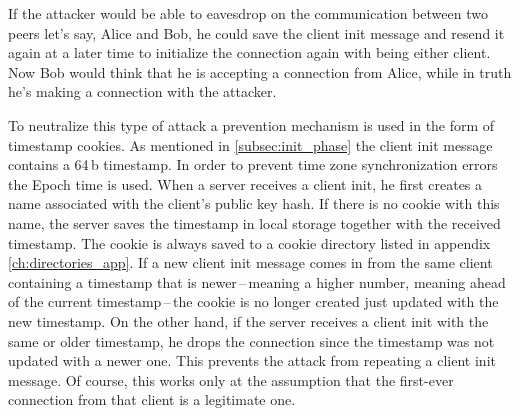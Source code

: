 If the attacker would be able to eavesdrop on the communication between two peers let's say, Alice and Bob, he could save the client init message and resend it again at a later time to initialize the connection again with being either client. Now Bob would think that he is accepting a connection from Alice, while in truth he's making a connection with the attacker.

To neutralize this type of attack a prevention mechanism is used in the form of timestamp cookies. As mentioned in \ref{subsec:init_phase} the client init message contains a 64\,b timestamp. In order to prevent time zone synchronization errors the Epoch time is used. When a server receives a client init, he first creates a name associated with the client's public key hash. If there is no cookie with this name, the server saves the timestamp in local storage together with the received timestamp. The cookie is always saved to a cookie directory listed in appendix \ref{ch:directories_app}. If a new client init message comes in from the same client containing a timestamp that is newer\,--\,meaning a higher number, meaning ahead of the current timestamp\,--\,the cookie is no longer created just updated with the new timestamp. On the other hand, if the server receives a client init with the same or older timestamp, he drops the connection since the timestamp was not updated with a newer one. This prevents the attack from repeating a client init message. Of course, this works only at the assumption that the first-ever connection from that client is a legitimate one.
